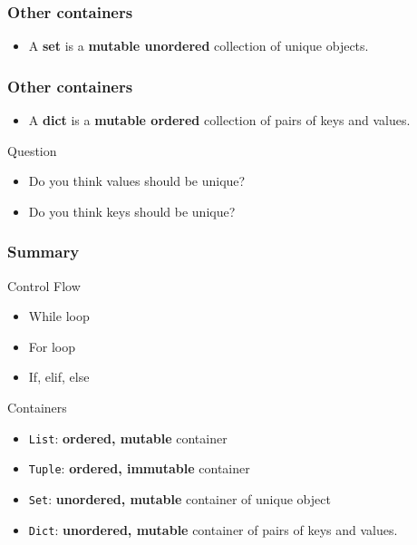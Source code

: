 \documentclass[xcolor=dvipsnames]{beamer}
\begin{document}
\begin{frame}
\frametitle{Other containers}
\begin{itemize}
\item A \textbf{set} is a \textbf{mutable unordered} collection of unique objects.

\end{itemize}
\end{frame}

\begin{frame}
\frametitle{Other containers}
\begin{itemize}
\item A \textbf{dict} is a \textbf{mutable ordered} collection of pairs of keys
and values.

\end{itemize}

\begin{alertblock}{Question}
\begin{itemize}
\item Do you think values should be unique?
\item Do you think keys should be unique?
\end{itemize}
\end{alertblock}
\end{frame}

\begin{frame}
\frametitle{Summary}
\begin{block}{Control Flow}
\begin{itemize}
\item While loop
\item For loop
\item If, elif, else
\end{itemize}
\end{block}

\begin{block}{Containers}
\begin{itemize}
\item \texttt{List}: \textbf{ordered, mutable} container
\item \texttt{Tuple}: \textbf{ordered, immutable} container
\item \texttt{Set}: \textbf{unordered, mutable} container of unique object
\item \texttt{Dict}: \textbf{unordered, mutable} container of pairs of keys and values.
\end{itemize}
\end{block}
\end{frame}
\end{document}

